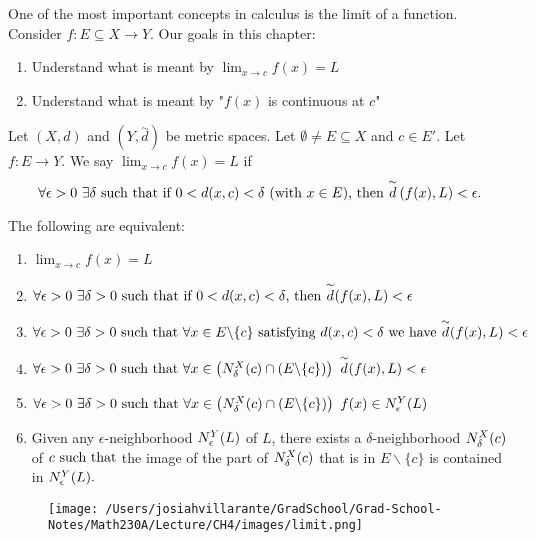 One of the most important concepts in calculus is the limit of a function. Consider $f: E\subseteq X \to Y$. Our goals in this chapter:
\begin{enumerate}[$(i)$]
    \item Understand what is meant by $\lim_{x\to c}f(x) = L$
    \item Understand what is meant by "$f(x)$ is continuous at $c$"
\end{enumerate}

\begin{definition}
    Let $(X,d)$ and $(Y, \overset{\sim}{d})$ be metric spaces. Let $\emptyset \not = E \subseteq X$ and $c \in E'$. Let $f: E \to Y$. We say $\lim_{x \to c} f(x) = L$ if
    $$\forall \epsilon > 0 ~\exists \delta \text{ such that } \text{if } 0 < d(x,c) < \delta \text{ (with $x\in E$), then } \overset{\sim}{d}\left(f(x), L\right) < \epsilon.$$
\end{definition}

\begin{remark}
    The following are equivalent:
    \begin{enumerate}[$(i)$]
        \item $\lim_{x \to c}f(x) = L$
        \item $\forall \epsilon > 0 ~\exists \delta > 0 \text{ such that } \text{if $0<d(x,c) < \delta$, then $\overset{\sim}{d}(f(x), L) < \epsilon$}$
        \item $\forall \epsilon > 0 ~\exists \delta > 0 \text{ such that } \text{$\forall x \in E \backslash \{c\}$ satisfying $d(x,c) < \delta$ we have $\overset{\sim}{d}(f(x), L)< \epsilon$}$
        \item $\forall \epsilon > 0 ~\exists \delta > 0 \text{ such that } \forall x \in \left(N_\delta ^X (c) \cap \left(E \backslash \{c\}\right)\right) ~\overset{\sim}{d}(f(x),L) < \epsilon$
        \item $\forall \epsilon > 0 ~\exists \delta > 0 \text{ such that } \forall x \in \left(N_{\delta}^{X}(c)\cap \left(E \backslash \{c\}\right)\right) ~f(x) \in N_{\epsilon}^{Y}(L)$
        \item Given any $\epsilon$-neighborhood $N_{\epsilon}^{Y}(L)$ of $L$, there exists a $\delta$-neighborhood $N_{\delta}^{X}(c)$ of $c \text{ such that }$the image of the part of $N_{\delta}^{X}(c)$ that is in $E \backslash \{c\}$ is contained in $N_{\epsilon}^{Y}(L).$
    \end{enumerate}
\end{remark}
\begin{figure}[h]
    \texttt{[image: /Users/josiahvillarante/GradSchool/Grad-School-Notes/Math230A/Lecture/CH4/images/limit.png]}
\end{figure}

